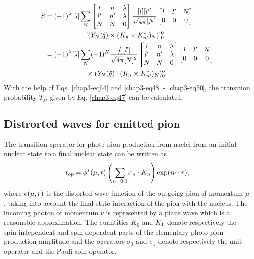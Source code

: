\begin{align}
  S & = (-1)^\lambda [\lambda] \sum_{N} \begin{bmatrix} l & n & \lambda\\ l' & n' & \lambda\\ N & N & 0  \end{bmatrix}
  \frac{[l][l']}{\sqrt{4 \pi}[N]} \begin{bmatrix}l & l' & N\\ 0 & 0 & 0  \end{bmatrix}\notag \\
       & \qquad \qquad \qquad [(Y_N ({\boldmath \hat{q}}) \times ({\boldmath K}_n \times {\boldmath K_{n'}^\ast})_N)]_0^0\notag \\
  & = (-1)^\lambda [\lambda] \sum_{N} (-1)^N  \frac{[l][l']}{\sqrt{4 \pi}[N]^2}
  \begin{bmatrix} l & n & \lambda\\ l' & n' & \lambda\\ N & N & 0  \end{bmatrix}
  \begin{bmatrix}l & l' & N\\ 0 & 0 & 0  \end{bmatrix} \notag \\
  & \qquad \qquad \qquad \times (Y_N ({\boldmath \hat{q}}) \cdot  ({\boldmath K}_n \times {\boldmath K_{n'}^\ast})_N)_0^0\label{chap3-eq54}
\end{align}
With the help of Eqs. \eqref{chap3-eq54} and \eqref{chap3-eq48} - \eqref{chap3-eq50}, the transition probability $T_{fi}$ given by Eq. \eqref{chap3-eq47} can be calculated.

\subsection{Distrorted waves for emitted pion} \label{chap3-sec5.2}

The transition operator for photo-pion production from nuclei from an initial nuclear state to a final nuclear state can be written as
\begin{equation}
t_{\text{op}} = \phi^\ast ({\boldmath \mu, r}) \left( \sum_{n=0, 1} \sigma_n \cdot {\boldmath K}_n\right) \exp (i \nu \cdot {\boldmath r}), \label{chap3-eq55}
\end{equation}
where $\phi (\mu, {\boldmath r})$ is the distorted wave function of the outgoing pion of momentum $\mu$, taking into account the final state interaction of the pion with the nucleus. The incoming photon of momentum $\nu$ is represented by a plane wave which is a reasonable approximation. The quantities $K_0$ and ${\boldmath K}_1$ denote respectively the spin-independent and spin-dependent parts of the elementary photo-pion production amplitude and the operators $\sigma_0$ and $\sigma_1$ denote respectively the unit operator and the Pauli spin operator.

